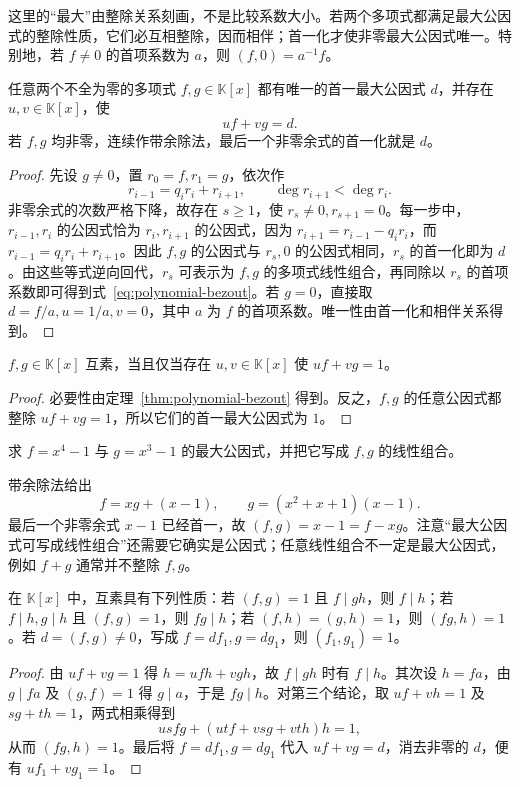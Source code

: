 这里的“最大”由整除关系刻画，不是比较系数大小。若两个多项式都满足最大公因式的整除性质，它们必互相整除，因而相伴；首一化才使非零最大公因式唯一。特别地，若 $f\ne0$ 的首项系数为 $a$，则 $(f,0)=a^{-1}f$。

\begin{theorem}
\label{thm:polynomial-bezout}
任意两个不全为零的多项式 $f,g\in\mathbb K[x]$ 都有唯一的首一最大公因式 $d$，并存在 $u,v\in\mathbb K[x]$，使
\begin{equation}
\label{eq:polynomial-bezout}
    uf+vg=d.
\end{equation}
若 $f,g$ 均非零，连续作带余除法，最后一个非零余式的首一化就是 $d$。
\end{theorem}
\begin{proof}
先设 $g\ne0$，置 $r_0=f,r_1=g$，依次作
\[
    r_{i-1}=q_ir_i+r_{i+1},\qquad \deg r_{i+1}<\deg r_i.
\]
非零余式的次数严格下降，故存在 $s\geq1$，使 $r_s\ne0,r_{s+1}=0$。每一步中，$r_{i-1},r_i$ 的公因式恰为 $r_i,r_{i+1}$ 的公因式，因为 $r_{i+1}=r_{i-1}-q_ir_i$，而 $r_{i-1}=q_ir_i+r_{i+1}$。因此 $f,g$ 的公因式与 $r_s,0$ 的公因式相同，$r_s$ 的首一化即为 $d$。由这些等式逆向回代，$r_s$ 可表示为 $f,g$ 的多项式线性组合，再同除以 $r_s$ 的首项系数即可得到式~\eqref{eq:polynomial-bezout}。若 $g=0$，直接取 $d=f/a,u=1/a,v=0$，其中 $a$ 为 $f$ 的首项系数。唯一性由首一化和相伴关系得到。
\end{proof}

\begin{corollary}
\label{cor:polynomial-coprime-bezout}
$f,g\in\mathbb K[x]$ 互素，当且仅当存在 $u,v\in\mathbb K[x]$ 使 $uf+vg=1$。
\end{corollary}
\begin{proof}
必要性由定理~\ref{thm:polynomial-bezout} 得到。反之，$f,g$ 的任意公因式都整除 $uf+vg=1$，所以它们的首一最大公因式为 $1$。
\end{proof}

\begin{example}
求 $f=x^4-1$ 与 $g=x^3-1$ 的最大公因式，并把它写成 $f,g$ 的线性组合。
\end{example}
\begin{solve}
带余除法给出
\[
    f=xg+(x-1),\qquad
    g=(x^2+x+1)(x-1).
\]
最后一个非零余式 $x-1$ 已经首一，故 $(f,g)=x-1=f-xg$。注意“最大公因式可写成线性组合”还需要它确实是公因式；任意线性组合不一定是最大公因式，例如 $f+g$ 通常并不整除 $f,g$。
\end{solve}

\begin{proposition}
\label{prop:polynomial-coprime-rules}
在 $\mathbb K[x]$ 中，互素具有下列性质：若 $(f,g)=1$ 且 $f\mid gh$，则 $f\mid h$；若 $f\mid h,g\mid h$ 且 $(f,g)=1$，则 $fg\mid h$；若 $(f,h)=(g,h)=1$，则 $(fg,h)=1$。若 $d=(f,g)\ne0$，写成 $f=df_1,g=dg_1$，则 $(f_1,g_1)=1$。
\end{proposition}
\begin{proof}
由 $uf+vg=1$ 得 $h=ufh+vgh$，故 $f\mid gh$ 时有 $f\mid h$。其次设 $h=fa$，由 $g\mid fa$ 及 $(g,f)=1$ 得 $g\mid a$，于是 $fg\mid h$。对第三个结论，取 $uf+vh=1$ 及 $sg+th=1$，两式相乘得到
\[
    usfg+(utf+vsg+vth)h=1,
\]
从而 $(fg,h)=1$。最后将 $f=df_1,g=dg_1$ 代入 $uf+vg=d$，消去非零的 $d$，便有 $uf_1+vg_1=1$。
\end{proof}

